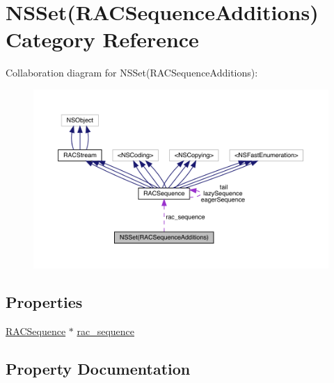 \hypertarget{category_n_s_set_07_r_a_c_sequence_additions_08}{}\section{N\+S\+Set(R\+A\+C\+Sequence\+Additions) Category Reference}
\label{category_n_s_set_07_r_a_c_sequence_additions_08}


Collaboration diagram for N\+S\+Set(R\+A\+C\+Sequence\+Additions)\+:\nopagebreak
\begin{figure}[H]
\begin{center}
\leavevmode
\includegraphics[width=350pt]{category_n_s_set_07_r_a_c_sequence_additions_08__coll__graph}
\end{center}
\end{figure}
\subsection*{Properties}
\begin{DoxyCompactItemize}
\item 
\mbox{\hyperlink{interface_r_a_c_sequence}{R\+A\+C\+Sequence}} $\ast$ \mbox{\hyperlink{category_n_s_set_07_r_a_c_sequence_additions_08_a29963ec171f2b298ecfdd99b36d9f250}{rac\+\_\+sequence}}
\end{DoxyCompactItemize}


\subsection{Property Documentation}
\mbox{\label{category_n_s_set_07_r_a_c_sequence_additions_08_a29963ec171f2b298ecfdd99b36d9f250}} 
